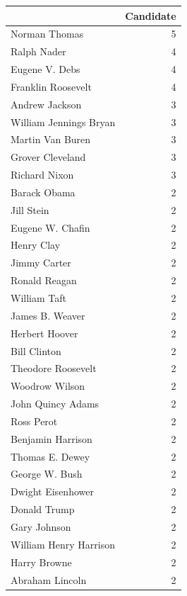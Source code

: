 \documentclass[
  letterpaper,
  DIV=11,
  numbers=noendperiod]{scrreprt}
\begin{document}
\begin{tabular}{lr}
\toprule
{} &  Candidate \\
\midrule
Norman Thomas          &          5 \\
Ralph Nader            &          4 \\
Eugene V. Debs         &          4 \\
Franklin Roosevelt     &          4 \\
Andrew Jackson         &          3 \\
William Jennings Bryan &          3 \\
Martin Van Buren       &          3 \\
Grover Cleveland       &          3 \\
Richard Nixon          &          3 \\
Barack Obama           &          2 \\
Jill Stein             &          2 \\
Eugene W. Chafin       &          2 \\
Henry Clay             &          2 \\
Jimmy Carter           &          2 \\
Ronald Reagan          &          2 \\
William Taft           &          2 \\
James B. Weaver        &          2 \\
Herbert Hoover         &          2 \\
Bill Clinton           &          2 \\
Theodore Roosevelt     &          2 \\
Woodrow Wilson         &          2 \\
John Quincy Adams      &          2 \\
Ross Perot             &          2 \\
Benjamin Harrison      &          2 \\
Thomas E. Dewey        &          2 \\
George W. Bush         &          2 \\
Dwight Eisenhower      &          2 \\
Donald Trump           &          2 \\
Gary Johnson           &          2 \\
William Henry Harrison &          2 \\
Harry Browne           &          2 \\
Abraham Lincoln        &          2 \\

\end{tabular}
\end{document}
